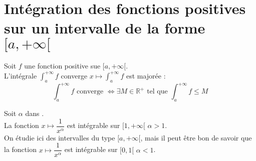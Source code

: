 \documentclass[11pt,a4paper,fleqn,pdftex]{report}
\begin{document}
\section{Intégration des fonctions positives sur un intervalle de la forme $[a,+\infty[$} %
\label{sec:integration_fonction_positives}
\begin{itheorem}
    \label{thm:fonction_positive_integrable}
     Soit $f$ une fonction positive sue $[a,+\infty [$.\\
     L'intégrale $\int_a^{+\infty} f$ converge \ssi{} $x \longmapsto \int_a^{+\infty} f$ est majorée : 
     \begin{equation}
     \int_a^{+\infty} f\text{ converge }\Longleftrightarrow \exists M\in \mathbb{R}^+\text{ tel que }\int_a^{+\infty} f \le M
     \end{equation}
\end{itheorem}
\begin{itheorem}
\label{thm:integrale_riemann}
     Soit $\alpha$ dans \Reel{}.\\
     La fonction $x \longmapsto \dfrac{1}{x^\alpha}$ est intégrable sur $[1,+\infty [$ \ssi{} $\alpha > 1$.\\[1.3\baselineskip] 
     On étudie ici des intervalles du type $[a,+\infty [$, mais il peut être bon de savoir que la fonction $x \longmapsto \dfrac{1}{x^\alpha}$ est intégrable sur $[0,1 [$ \ssi{} $\alpha < 1$.
\end{itheorem}
\end{document}
